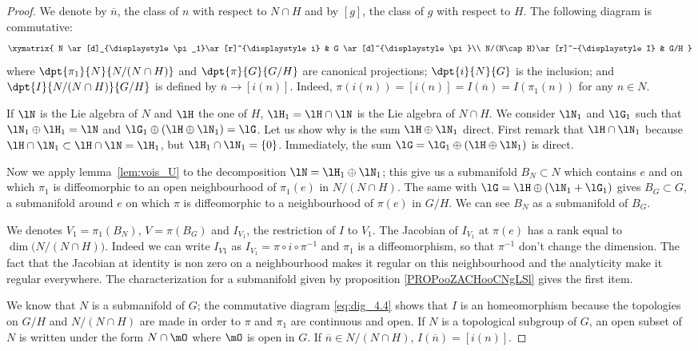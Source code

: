 \begin{proof}
	We denote by $\overline{n}$, the class of $n$ with respect to $N\cap H$ and by $[g]$, the class of $g$ with respect to $H$.
	The following diagram is commutative:
	\begin{equation}\label{eq:dig_4.4}
		\xymatrix{
		N  \ar[d]_{\displaystyle\pi_1}\ar[r]^{\displaystyle i} &  G \ar[d]^{\displaystyle\pi}\\
		N/(N\cap H)\ar[r]^-{\displaystyle I} &       G/H
		}
	\end{equation}
	where $\dpt{\pi_1}{N}{N/(N\cap H)}$ and $\dpt{\pi}{G}{G/H}$ are canonical projections; $\dpt{i}{N}{G}$ is the inclusion; and $\dpt{I}{N/(N\cap H)}{G/H}$ is defined by $\overline{n}\to [i(n)]$. Indeed, $\pi(i(n))=[i(n)]=I( \overline{n} )=I(\pi_1(n))$ for any $n\in N$.

	If $\lN$ is the Lie algebra of $N$ and $\lH$ the one of $H$, $\lH_1=\lH\cap\lN$ is the Lie algebra of $N\cap H$. We consider $\lN_1$ and  $\lG_1$ such that $\lN_1\oplus\lH_1=\lN$ and $\lG_1\oplus(\lH\oplus\lN_1)=\lG$. Let us show why is the sum $\lH\oplus\lN_1$ direct. First remark that $\lH\cap\lN_1$ because $\lH\cap\lN_1\subset\lH\cap\lN=\lH_1$, but $\lH_1\cap\lN_1=\{0\}$. Immediately, the sum $\lG=\lG_1\oplus(\lH\oplus\lN_1)$ is direct.

	Now we apply lemma~\ref{lem:vois_U} to the decomposition $\lN=\lH_1\oplus\lN_1$; this give us a submanifold $B_N\subset N$ which contains $e$ and on which $\pi_1$ is diffeomorphic to an open neighbourhood of $\pi_1(e)$ in $N/(N\cap H)$. The same with $\lG=\lH\oplus(\lN_1+\lG_1)$ gives $B_G\subset G$, a submanifold around $e$ on which $\pi$ is diffeomorphic to a neighbourhood of $\pi(e)$ in $G/H$. We can see $B_N$ as a submanifold of $B_G$.

	We denotes $V_1=\pi_1(B_N)$, $V=\pi(B_G)$ and $I_{V_1}$, the restriction of $I$ to $V_1$. The Jacobian of $I_{V_1}$ at $\pi(e)$ has a rank equal to $\dim\big( N/(N\cap H) \big)$. Indeed we can write $I_{V1}$ as $I_{V_1}=\pi\circ i\circ\pi^{-1}$ and $\pi_1$ is a diffeomorphism, so that $\pi^{-1}$ don't change the dimension. The fact that the Jacobian at identity is non zero on a neighbourhood makes it regular on this neighbourhood and the analyticity make it regular everywhere. The characterization for a submanifold given by proposition \ref{PROPooZACHooCNgLSl} gives the first item.

	We know that $N$ is a submanifold of $G$; the commutative diagram \eqref{eq:dig_4.4} shows that $I$ is an homeomorphism because the topologies on $G/H$ and $N/(N\cap H)$ are made in order to $\pi$ and $\pi_1$ are continuous and open. If $N$ is a topological subgroup of $G$, an open subset of $N$ is written under the form $N\cap\mO$ where $\mO$ is open in $G$. If $\overline{n}\in N/(N\cap H)$, $I(\overline{n})=[i(n)]$.


\end{proof}
